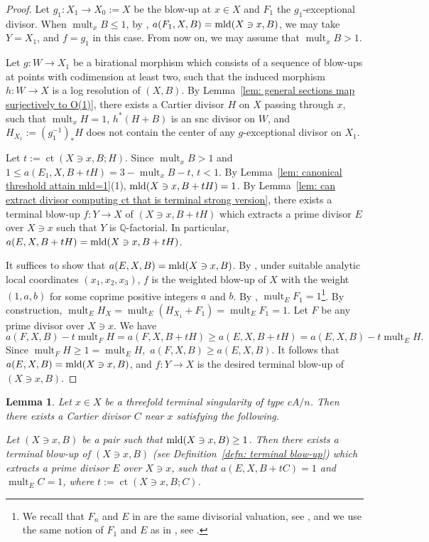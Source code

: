 \documentclass[11pt]{amsart}
\numberwithin{equation}{section}
\newcommand{\Qq}{\mathbb{Q}}
\newcommand{\mld}{{\rm{mld}}}
\newcommand{\ct}{\operatorname{ct}}
\newcommand{\mult}{\operatorname{mult}}
\newtheorem{lem}[thm]{Lemma}
\theoremstyle{definition}
\theoremstyle{definition}
\begin{document}
\begin{proof}
Let $g_1: X_1\to X_0:=X$ be the blow-up at $x\in X$ and $F_1$ the $g_1$-exceptional divisor. When $\mult_x B\leq 1$, by \cite[Proposition~6(i)]{Kaw17}, $a(F_1,X,B)=\mld(X\ni x, B)$, we may take $Y=X_1$, and $f=g_1$ in this case. From now on, we may assume that $\mult_x B>1$.

Let $g: W\to X_1$ be a birational morphism which consists of a sequence of blow-ups at points with codimension at least two, such that the induced morphism $h: W\to X$ is a log resolution of $(X,B)$. By Lemma~\ref{lem: general sections map surjectively to O(1)}, there exists a Cartier divisor $H$ on $X$ passing through $x$, such that $\mult_x H=1$, $h^*(H+B)$ is an snc divisor on $W$, and $H_{X_1}:=(g_1^{-1})_*H$ does not contain the center of any $g$-exceptional divisor on $X_1$.

Let $t:=\ct(X\ni x, B;H)$. Since $\mult_x B> 1$ and $1\leq a(E_1,X,B+tH)=3-\mult_x B-t$, $t<1$. By Lemma~\ref{lem: canonical threshold attain mld=1}(1), $\mld(X\ni x,B+tH)=1$. By Lemma~\ref{lem: can extract divisor computing ct that is terminal strong version}, there exists a terminal blow-up $f: Y\to X$ of $(X\ni x, B+tH)$ which extracts a prime divisor $E$ over $X\ni x$ such that $Y$ is $\Qq$-factorial. In particular, $a(E,X,B+tH)=\mld(X\ni x, B+tH)$.

It suffices to show that $a(E,X,B)=\mld(X\ni x,B)$. By \cite[Theorem 1.1]{Kaw01}, under suitable analytic local coordinates $(x_1,x_2,x_3)$, $f$ is the weighted blow-up of $X$ with the weight $(1,a,b)$ for some coprime positive integers $a$ and $b$. By \cite[Proof of Proposition~3.6, line 6]{Kaw01}, $\mult_E F_1=1$\footnote{We recall that $F_n$ and $E$ in \cite[Proposition~3.6]{Kaw01} are the same divisorial valuation, see \cite[Remark~3.3]{Kaw01}, and we use the same notion of $F_1$ and $E$ as in \cite[\S 3]{Kaw01}, see \cite[Construnction 3.1]{Kaw01}.}. By construction, $\mult_E H_X=\mult_E(H_{X_1}+F_1)=\mult_E F_1=1$. Let $F$ be any prime divisor over $X\ni x$. We have $$a(F,X,B)-t\mult_F H=a(F,X,B+tH)\geq a(E,X,B+tH)=a(E,X,B)-t\mult_E H.$$ Since $\mult_F H\geq 1=\mult_E H,$ $a(F,X,B)\geq a(E,X,B)$. It follows that $a(E,X,B)=\mld(X\ni x, B)$, and $f: Y\to X$ is the desired terminal blow-up of $(X\ni x, B)$.
\end{proof}


\begin{lem}\label{lem: can extract mld place cA/n case}
Let $x\in X$ be a threefold terminal singularity of type $cA/n$. Then there exists a Cartier divisor $C$ near $x$ satisfying the following.

Let $(X\ni x, B)$ be a pair such that $\mld(X\ni x, B)\geq 1$. Then there exists a terminal blow-up of $(X\ni x, B)$ (see Definition~\ref{defn: terminal blow-up}) which extracts a prime divisor $E$ over $X\ni x$, such that $a(E,X,B+tC)=1$ and $\mult_E C=1$, where $t:=\ct(X\ni x, B;C)$.
\end{lem}
\end{document}
